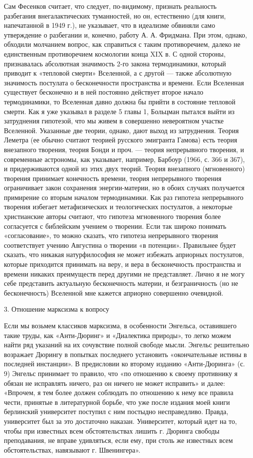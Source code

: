 Сам Фесенков считает, что следует, по-видимому, признать реальность разбегания
внегалактических туманностей, но он, естественно (для книги, напечатанной в
1949 г.), не указывает, что в идеализме обвиняли само утверждение о разбегании
и, конечно, работу А. А. Фридмана. При этом, однако, обходили молчанием вопрос,
как справиться с таким противоречием, далеко не единственным противоречием
космологии конца XIX в. С одной стороны, признавалась абсолютная значимость
2-го закона термодинамики, который приводит к «тепловой смерти» Вселенной, а с
другой --- также абсолютную значимость постулата о бесконечности пространства и
времени. Если Вселенная существует бесконечно и в ней постоянно действует
второе начало термодинамики, то Вселенная давно должна бы прийти в состояние
тепловой смерти. Как я уже указывал в разделе 5 главы 1, Больцман пытался выйти
из затруднения гипотезой, что мы живем в совершенно невероятном участке
Вселенной. Указанные две теории, однако, дают выход из затруднения. Теория
Леметра (ее обычно считают теорией русского эмигранта Гамова) есть теория
внезапного творения, теория Бонди и проч. --- теория непрерывного творения, и
современные астрономы, как указывает, например, Барбоур (1966, с. 366 и 367), и
придерживаются одной из этих двух теорий. Теория внезапного (мгновенного)
творения принимает конечность времени, теория непрерывного творения
ограничивает закон сохранения энергии-материи, но в обоих случаях получается
примирение со вторым началом термодинамики. Как раз гипотеза непрерывного
творения избегает метафизических и теологических постулатов, а некоторые
христианские авторы считают, что гипотеза мгновенного творения более
согласуется с библейским учением о творении. Если так широко понимать
«согласование», то можно сказать, что гипотеза непрерывного творения
соответствует учению Августина о творении «в потенции». Правильнее будет
сказать, что никакая натурфилософия не может избежать априорных постулатов,
которые приходится принимать на веру, и вера в бесконечность пространства и
времени никаких преимуществ перед другими не представляет. Лично я не могу себе
представить актуальную бесконечность материи, и безграничность (но не
бесконечность) Вселенной мне кажется априорно совершенно очевидной.

3. Отношение марксизма к вопросу

Если мы возьмем классиков марксизма, в особенности Энгельса, оставившего такие
труды, как «Анти-Дюринг» и «Диалектика природы», то легко можем найти ряд
указаний на их сочувствие полной свободе мысли. Энгельс решительно возражает
Дюрингу в попытках последнего установить «окончательные истины в последней
инстанции». В предисловии ко второму изданию «Анти-Дюринга» (с. 9) Энгельс
принимает то правило, что «по отношению к своему противнику я обязан не
исправлять ничего, раз он ничего не может исправить» и далее: «Впрочем, я тем
более должен соблюдать по отношению к нему все правила чести, принятые в
литературной борьбе, что уже после издания моей книги берлинский университет
поступил с ним постыдно несправедливо. Правда, университет был за это
достаточно наказан. Университет, который идет на то, чтобы при известных всем
обстоятельствах лишить г. Дюринга свободы преподавания, не вправе удивляться,
если ему, при столь же известных всем обстоятельствах, навязывают г.
Швенингера».

